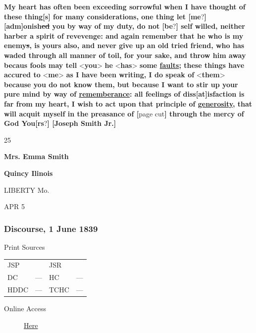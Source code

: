 					\textbf{My heart has often been exceeding sorrowful when I have thought of these thing[s] for many considerations, one thing let [me}?\textbf{] [adm]onish\sout{ed} you by way of my duty, do not [be}?\textbf{] self willed, neither harber a spirit of revevenge: and again remember that he who is my enemy\sout{s}, is yours also, and never give up an old tried friend, who has waded through all manner of toil, for your sake, and throw him away becaus fools may tell} <\textbf{you}> \textbf{he} <\textbf{has}> \textbf{some \uline{faults}; these things have accured to} <\textbf{me}> \textbf{as I have been writing, I do speak of} <\textbf{them}> \textbf{because you do not know them, but because I want to stir up your pure mind by way of \uline{rememberance}: all feelings of diss[at]isfaction is far from my heart, I wish to act upon that principle of \uline{generosity}, that will acquit myself in the preasance of [}page cut\textbf{] through the mercy of God You[rs}?\textbf{] [Joseph Smith Jr.]
					}

					\begin{tightright}
					25
					\end{tightright}

					\textbf{Mrs. Emma Smith}

					\textbf{Quincy Ilinois}

					LIBERTY Mo.

					APR 5
					
		\subsubsection{Discourse, 1 June 1839}
			\label{EMS-1839-JS-1-JUN-1839}
			
				\begin{description}
					\item[Print Sources]
				\end{description}

					\begin{tabular}{p{0.5in}p{1in}p{0.5in}p{1in}}
					JSP	 	& 			& JSR 		&  \\
					DC	 	& ---		& HC 		& --- \\
					HDDC 	& ---		& TCHC 		& --- \\
					\end{tabular}
				
				\begin{description}
					\item[Online Access] \href{https://www.josephsmithpapers.org/paper-summary/minutes-and-discourse-1-2-june-1839/1}{Here}
				\end{description}
				
